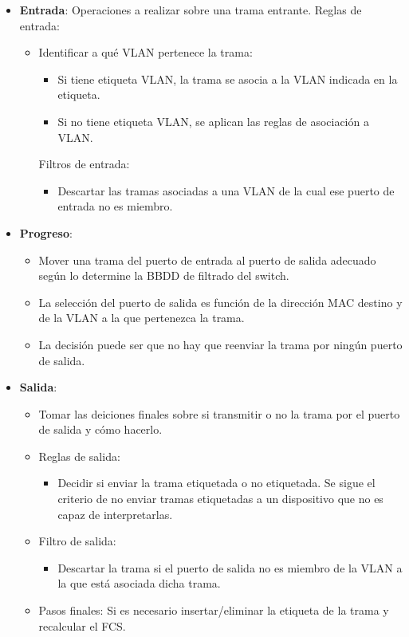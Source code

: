 \documentclass[10pt,portrait, twocolumn]{article}
\begin{document}
		\begin{itemize}
		\item \textbf{Entrada}: Operaciones a realizar sobre una trama entrante. Reglas de entrada:
			\begin{itemize}
			\item Identificar a qué VLAN pertenece la trama:
				\begin{itemize}
				\item Si tiene etiqueta VLAN, la trama se asocia a la VLAN indicada en la etiqueta.
				\item Si no tiene etiqueta VLAN, se aplican las reglas de asociación a VLAN.
				\end{itemize}
				
			Filtros de entrada: 
				\begin{itemize}
				\item Descartar las tramas asociadas a una VLAN de la cual ese puerto de entrada no es miembro.
				\end{itemize}
			\end{itemize}
		\item \textbf{Progreso}: 
			\begin{itemize}
			\item Mover una trama del puerto de entrada al puerto de salida adecuado según lo determine la BBDD de filtrado del switch. 
			\item La selección del puerto de salida es función de la dirección MAC destino y de la VLAN a la que pertenezca la trama.
			\item La decisión puede ser que no hay que reenviar la trama por ningún puerto de salida.
			\end{itemize}
			\item \textbf{Salida}:
				\begin{itemize}
				\item Tomar las deiciones finales sobre si transmitir o no la trama por el puerto de salida y cómo hacerlo.
				\item Reglas de salida:
					\begin{itemize}
					\item Decidir si enviar la trama etiquetada o no etiquetada. Se sigue el criterio de no enviar tramas etiquetadas a un dispositivo que no es capaz de interpretarlas.
					\end{itemize}
				\item Filtro de salida:
					\begin{itemize}
					\item Descartar la trama si el puerto de salida no es miembro de la VLAN a la que está asociada dicha trama.
					\end{itemize}
				\item Pasos finales: Si es necesario insertar/eliminar la etiqueta de la trama y recalcular el FCS.
				\end{itemize}
		\end{itemize}
		
\end{document}
